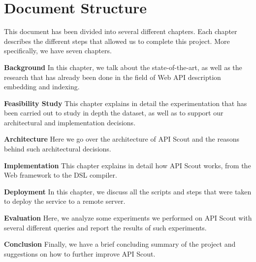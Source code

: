 \section{Document Structure}\label{sec:document-structure}
This document has been divided into several different chapters.
Each chapter describes the different steps that allowed us to complete this project.
More specifically, we have seven chapters.

\begin{description}
    \item \textbf{Background} In this chapter, we talk about the state-of-the-art, as well as the research that has already been done in the field of Web API description embedding and indexing.
    \item \textbf{Feasibility Study} This chapter explains in detail the experimentation that has been carried out to study in depth the dataset,
    as well as to support our architectural and implementation decisions.
    \item \textbf{Architecture} Here we go over the architecture of API Scout and the reasons behind such architectural decisions.
    \item \textbf{Implementation} This chapter explains in detail how API Scout works, from the Web framework to the DSL compiler.
    \item \textbf{Deployment} In this chapter, we discuss all the scripts and steps that were taken to deploy the service to a remote server.
    \item \textbf{Evaluation} Here, we analyze some experiments we performed on API Scout with several different queries and report the results of such experiments.
    \item \textbf{Conclusion} Finally, we have a brief concluding summary of the project and suggestions on how to further improve API Scout.
\end{description}
